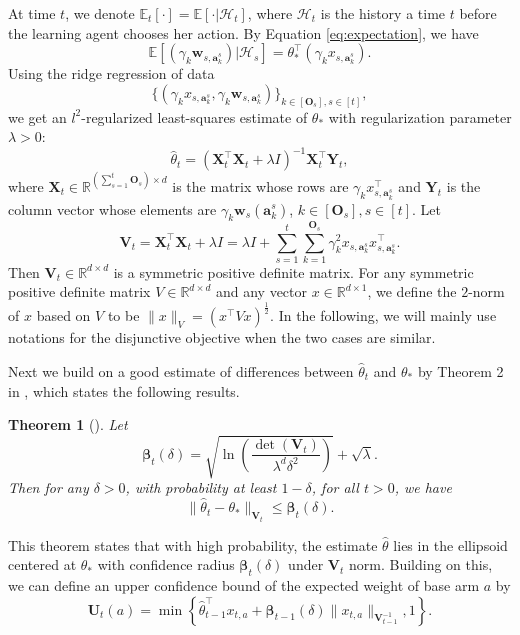 \documentclass{article}
\newcommand{\bbeta}{\boldsymbol{\beta}}
\newcommand{\EE}{\mathbb{E}}
\newcommand{\RR}{\mathbb{R}}
\newcommand{\ba}{\mathbf{a}}
\newcommand{\bO}{\mathbf{O}}
\newcommand{\bU}{\mathbf{U}}
\newcommand{\bV}{\mathbf{V}}
\newcommand{\bw}{\mathbf{w}}
\newcommand{\bX}{\mathbf{X}}
\newcommand{\bY}{\mathbf{Y}}
\newcommand{\cH}{\mathcal{H}}
\newcommand{\norm}[1]{\| #1 \|}
\newtheorem{theorem}{Theorem}[section]
\begin{document}
At time $t$, we denote $\EE_t[\cdot] = \EE[\cdot | \cH_t]$, where $\cH_t$ is the history a time $t$ before the learning agent chooses her action. By Equation \eqref{eq:expectation}, we have 
$$
  \EE[(\gamma_k \bw_{s,\ba_k^s}) | \cH_{s}] = \theta_*^{\top} (\gamma_k x_{s,\ba_k^s}).
$$
Using the ridge regression of data 
$$
  \{(\gamma_k x_{s,\ba_k^s}, \gamma_k \bw_{s,\ba_k^s})\}_{k \in[\bO_s], s\in[t]},
$$
we get an $l^2$-regularized least-squares estimate of $\theta_*$ with regularization parameter $\lambda > 0$:
\begin{equation}
  \hat{\theta}_t = (\bX_t^{\top}\bX_t + \lambda I)^{-1} \bX_t^{\top} \bY_t,
\end{equation}
where $\bX_t \in \RR^{(\sum_{s=1}^{t}\bO_s) \times d}$ is the matrix whose rows are $\gamma_k x_{s,\ba_k^s}^{\top}$ and $\bY_t$ is the column vector whose elements are $\gamma_k \bw_s(\ba_k^s)$, $k \in[\bO_s], s\in[t]$. Let
$$
  \bV_t = \bX_t^{\top} \bX_t + \lambda I = \lambda I + \sum_{s=1}^{t} \sum_{k=1}^{\bO_s} \gamma_k^2 x_{s,\ba_k^s}x_{s,\ba_k^s}^{\top}.
$$
Then $\bV_t \in \RR^{d \times d}$ is a symmetric positive definite matrix. 
For any symmetric positive definite matrix $V \in \RR^{d \times d} $ and any vector $x \in \RR^{d \times 1}$, we define the $2$-norm of $x$ based on $V$ to be $\norm{x}_V = (x^{\top} V x)^{\frac{1}{2}}$.
In the following, we will mainly use notations for the disjunctive objective when the two cases are similar.

Next we build on a good estimate of differences between $\hat{\theta}_t$ and $\theta_*$ by Theorem 2 in \cite{abbasi2011improved}, which states the following results.
	
\begin{theorem}[\cite{abbasi2011improved}] %
  \label{thm:theta_estimate}
  Let 
  \begin{equation}
    \bbeta_{t}(\delta) = \sqrt{\ln\left(\frac{\det(\bV_{t})}{\lambda^d \delta^2}\right)} + \sqrt{\lambda}. \label{eq:definebeta}
  \end{equation}
  Then for any $\delta > 0$, with probability at least $1 - \delta$, for all $t > 0$, we have
  \begin{equation}
    \label{eq:estimateTheta}
    \norm{\hat{\theta}_t - \theta_{\ast}}_{\bV_{t}} \leq \bbeta_{t}(\delta).
  \end{equation}
\end{theorem}

This theorem states that with high probability, the estimate $\hat{\theta}$ lies in the ellipsoid centered at $\theta_*$ with confidence radius $\bbeta_t(\delta)$ under $\bV_t$ norm. 
Building on this, we can define an upper confidence bound of the expected weight of base arm $a$ by
\begin{equation}
  \label{eq:defU}
  \bU_t(a) = \min\left\{\hat{\theta}_{t-1}^{\top}x_{t,a} + \bbeta_{t-1}(\delta)\norm{x_{t,a}}_{\bV_{t-1}^{-1}}, 1 \right\}.
\end{equation}
\end{document}
